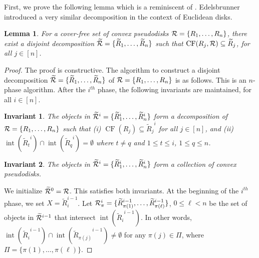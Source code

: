 \documentclass[a4paper,11pt]{article}
\DeclareMathOperator{\interior}{int}
\DeclareMathOperator{\CF}{CF}
\newtheorem{lemma}{Lemma}
\newtheorem{invariant}{Invariant}
\begin{document}
First, we prove the 
following lemma which is a reminiscent of \cite[Lem 3.3]{Ray}.  {Edelsbrunner~\cite{Edelsbrunner95} introduced a very similar decomposition in the context of Euclidean disks.}



\begin{lemma} \label{lDecompose1}
For a cover-free set  of convex pseudodisks ${\cal R}=\{ 
R_1,\ldots,R_n\}$, 
there exist a disjoint decomposition $\widetilde{\cal R}=\{ 
{{\widetilde{R}}_1},\ldots,{{\widetilde{R}}_n}\}$ such that $\CF(R_j, {\cal R})\subseteq 
{{\widetilde{R}}_j}$, for all $j\in [n]$.
\end{lemma}



\begin{proof}
The proof is constructive.
The algorithm to construct a disjoint decomposition    $\widetilde{\cal 
R}=\{ 
{{\widetilde{R}}_1},\ldots,{{\widetilde{R}}_n}\}$  of ${\cal R}=\{ R_1,\ldots,R_n\}$ 
is as  follows. This is an $n$-phase algorithm.
After the $i^{th}$ phase, the  following invariants are maintained, for all  
$i\in [n]$.

\begin{invariant}\label{inv1.1}
The objects in 
$\widetilde{\cal R}^{i}=\{{{\widetilde{R}}_1}^i,\ldots,{{\widetilde{R}}_n}^i\}$ form a 
decomposition of ${\cal R}=\{ 
R_1,\ldots,R_n\}$ such that (i) $\CF(R_j)\subseteq {{\widetilde{R}}_j}^i$ for all 
$j\in [n]$, and  (ii) 
$\interior({{\widetilde{R}}_t}^i) \cap \interior({{\widetilde{R}}_q}^i)=\emptyset$ 
where $t\neq q$ and $1\leq 
t \leq i$, $1\leq q \leq n$. 

\end{invariant}

\begin{invariant}\label{inv1.2}
The objects in $\widetilde{\cal 
R}^{i}=\{{{\widetilde{R}}_1}^i,\ldots,{{\widetilde{R}}_n}^i\}$ form a {collection of} convex pseudodisks. 
\end{invariant}

We initialize $\widetilde{\cal R}^0={\cal R}$. This satisfies both 
invariants.
At the beginning of the
$i^{th}$ phase,  we set $X=\widetilde{ 
R}_i^{i-1}$. 
Let ${\cal 
R}_{\pi}^i=\{{{\widetilde{R}}_{\pi(1)}}^{i-1}, \ldots, 
{{\widetilde{R}}_{\pi(\ell)}}^{i-1}\}$, $0\leq \ell<n$
be the set of  objects in  $\widetilde{\cal 
R}^{i-1}$ 
that intersect  $\interior({{\widetilde{R}}_i}^{i-1})$. In other words,
$\interior({{\widetilde{R}}_i}^{i-1})\cap 
\interior({{\widetilde{R}}_{\pi(j)}}^{i-1})\neq \emptyset$ for any  $\pi(j)\in \Pi$, 
where $\Pi=\{\pi(1), \ldots, \pi(\ell)\}$.



\end{proof}
\end{document}
